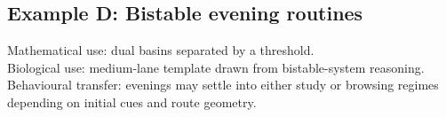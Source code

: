 \subsection*{Example D: Bistable evening routines}

Mathematical use: dual basins separated by a threshold.\\
Biological use: medium-lane template drawn from bistable-system reasoning.\\
Behavioural transfer: evenings may settle into either study or browsing
regimes depending on initial cues and route geometry.
